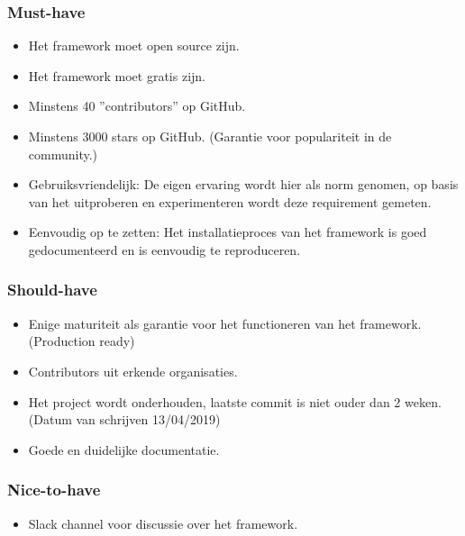 \subsubsection{Must-have}
\begin{itemize}
    \item Het framework moet open source zijn.
    \item Het framework moet gratis zijn.
    \item Minstens 40 ''contributors'' op GitHub.
    \item Minstens 3000 stars op GitHub. (Garantie voor populariteit in de community.)
    \item Gebruiksvriendelijk: De eigen ervaring wordt hier als norm genomen, op basis van het uitproberen en experimenteren wordt deze requirement gemeten.
    \item Eenvoudig op te zetten: Het installatieproces van het framework is goed gedocumenteerd en is eenvoudig te reproduceren.
\end{itemize}
\subsubsection{Should-have}
\begin{itemize}
    \item Enige maturiteit als garantie voor het functioneren van het framework. (Production ready)
    \item Contributors uit erkende organisaties.
    \item Het project wordt onderhouden, laatste commit is niet ouder dan 2 weken. (Datum van schrijven 13/04/2019)
    \item Goede en duidelijke documentatie.
\end{itemize}
\subsubsection{Nice-to-have}
\begin{itemize}
    \item Slack channel voor discussie over het framework.
\end{itemize}

